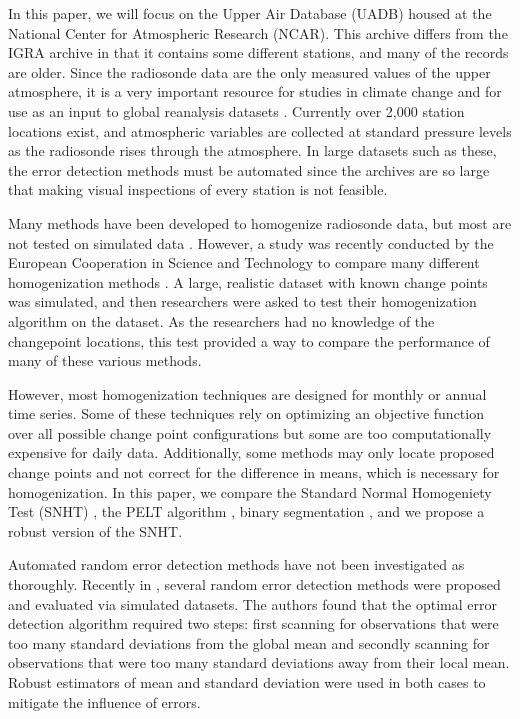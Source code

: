 \documentclass[12pt]{article}
\begin{document}
\begin{doublespacing}
In this paper, we will focus on the Upper Air Database (UADB) housed at the National Center for Atmospheric Research (NCAR). This archive differs from the IGRA archive in that it contains some different stations, and many of the records are older. Since the radiosonde data are the only measured values of the upper atmosphere, it is a very important resource for studies in climate change \cite{elliott91, eskridge95} and for use as an input to global reanalysis datasets \cite{kalnay96, kanamitsu02}. Currently over 2,000 station locations exist, and atmospheric variables are collected at standard pressure levels as the radiosonde rises through the atmosphere. In large datasets such as these, the error detection methods must be automated since the archives are so large that making visual inspections of every station is not feasible.

Many methods have been developed to homogenize radiosonde data, but most are not tested on simulated data \cite{eskridge95,gruber08,haimberger07,lanzante96,lanzante03,venema12}.  However, a study was recently conducted by the European Cooperation in Science and Technology to compare many different homogenization methods \cite{venema12}.  A large, realistic dataset with known change points was simulated, and then researchers were asked to test their homogenization algorithm on the dataset.  As the researchers had no knowledge of the changepoint locations, this test provided a way to compare the performance of many of these various methods.  

However, most homogenization techniques are designed for monthly or annual time series.  Some of these techniques rely on optimizing an objective function over all possible change point configurations \cite{killick12, li14, lu10, scott74} but some are too computationally expensive for daily data.  Additionally, some methods may only locate proposed change points and not correct for the difference in means, which is necessary for homogenization.  In this paper, we compare the Standard Normal Homogeniety Test (SNHT) \cite{alexandersson86}, the PELT algorithm \cite{killick12}, binary segmentation \cite{scott74}, and we propose a robust version of the SNHT.

Automated random error detection methods have not been investigated as thoroughly.  Recently in \cite{bell14}, several random error detection methods were proposed and evaluated via simulated datasets.  The authors found that the optimal error detection algorithm required two steps: first scanning for observations that were too many standard deviations from the global mean and secondly scanning for observations that were too many standard deviations away from their local mean.  Robust estimators of mean and standard deviation were used in both cases to mitigate the influence of errors.


\end{doublespacing}
\end{document}
